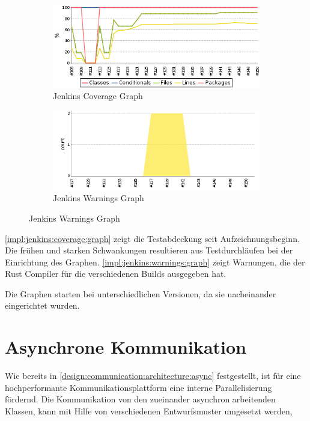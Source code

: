 \begin{figure}[H]
	\centering
	\begin{subfigure}{.5\textwidth}
		\includegraphics[width=\textwidth]{images/jenkins_coverage_graph.png}
		\caption{Jenkins Coverage Graph}
		\label{impl:jenkins:coverage:graph}
	\end{subfigure}%
	\begin{subfigure}{.5\textwidth}
		\includegraphics[width=\textwidth]{images/jenkins_warnings_graph.png}
		\caption{Jenkins Warnings Graph}
		\label{impl:jenkins:warnings:graph}
	\end{subfigure}
\end{figure}

\autoref{impl:jenkins:coverage:graph} zeigt die Testabdeckung seit Aufzeichnungsbeginn.
Die frühen und starken Schwankungen resultieren aus Testdurchläufen bei der Einrichtung des Graphen.
\autoref{impl:jenkins:warnings:graph} zeigt Warnungen, die der Rust Compiler für die verschiedenen Builds ausgegeben hat.

Die Graphen starten bei unterschiedlichen Versionen, da sie nacheinander eingerichtet wurden.

\clearpage
\section{Asynchrone Kommunikation}

 Wie bereits in \autoref{design:communication:architecture:async} festgestellt, ist für eine hochperformante Kommunikationsplattform eine interne Parallelisierung fördernd.
Die Kommunikation von den zueinander asynchron arbeitenden Klassen, kann mit Hilfe von verschiedenen Entwurfsmuster umgesetzt werden,

